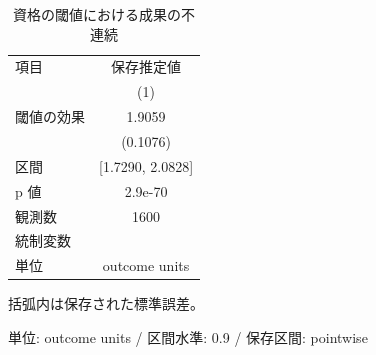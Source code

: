 \begingroup
\begin{table}[htbp]
\centering
\caption{資格の閾値における成果の不連続}
\label{tab:specialist-rdd-r01-rdd}
\begin{tabular}{lc}
\toprule
項目 & 保存推定値 \\
 & (1) \\
\midrule
閾値の効果 & 1.9059 \\
 & (0.1076) \\
区間 & [1.7290, 2.0828] \\
p 値 & 2.9e-70 \\
\midrule
観測数 & 1600 \\
統制変数 &  \\
単位 & outcome units \\
\bottomrule
\end{tabular}
\par\medskip\begin{minipage}{\linewidth}\footnotesize
括弧内は保存された標準誤差。\par 単位: outcome units / 区間水準: 0.9 / 保存区間: pointwise
\end{minipage}
\end{table}
\endgroup
